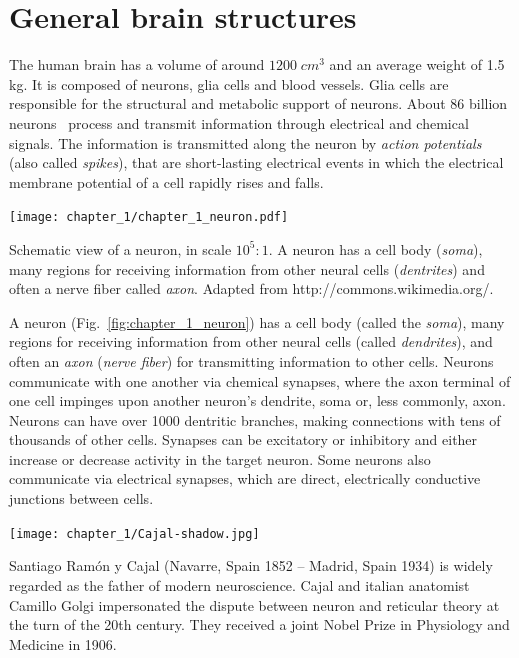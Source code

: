 \newpage


\section{General brain structures}\label{Chapter_1_Section_1}



The human brain has a volume of around $1200 \; cm^3$ and an average weight  of 1.5 kg. It is composed of neurons, glia cells and blood vessels. Glia cells are responsible for the structural and metabolic support of neurons. About $86$ billion neurons~\citep{Azevedo2009} process and transmit information through electrical and chemical signals. The information is transmitted along the neuron by \emph{action potentials}
(also called \emph{spikes}), that are short-lasting electrical events in which
the electrical membrane potential of a cell rapidly rises and falls. 

\begin{marginfigure}[-0.5cm]
\texttt{[image: chapter\_1/chapter\_1\_neuron.pdf]}
\vspace{-20pt}\caption{
Schematic view of a neuron, in scale $10^{5}:1$. A neuron has a cell body (\emph{soma}), many regions for receiving information from other neural cells (\emph{dentrites}) and often a nerve fiber called \emph{axon}.
Adapted from http://commons.wikimedia.org/.}\label{fig:chapter_1_neuron}
\end{marginfigure}


A neuron (Fig.~\ref{fig:chapter_1_neuron}) has a cell body (called the \emph{soma}), many regions for
receiving information from other neural cells (called \emph{dendrites}),
and
often an \emph{axon} (\emph{nerve fiber}) for transmitting information to
other
cells. Neurons communicate with one another via chemical synapses, where the axon terminal of one cell impinges upon another neuron's dendrite, soma or, less commonly, axon. Neurons can have over 1000 dentritic branches, making connections with tens of thousands of other cells. Synapses can be excitatory or inhibitory and either increase or decrease activity in the target neuron. Some neurons also communicate via electrical synapses, which are direct, electrically conductive junctions between cells.

\begin{marginfigure}[0.5cm]
\texttt{[image: chapter\_1/Cajal-shadow.jpg]}
\vspace{-10pt}\caption{
	Santiago Ramón y Cajal (Navarre, Spain 1852 – Madrid, Spain 1934) is widely regarded as the father of modern neuroscience. Cajal and italian anatomist Camillo Golgi impersonated the dispute between neuron and reticular theory at the turn of the 20th century. They received a joint Nobel Prize in Physiology and Medicine in 1906.
}
\end{marginfigure}



